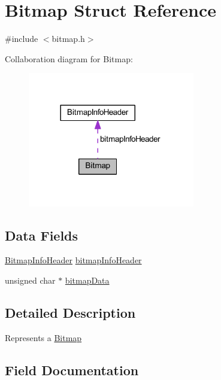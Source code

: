 \hypertarget{struct_bitmap}{}\section{Bitmap Struct Reference}
\label{struct_bitmap}


{\ttfamily \#include $<$bitmap.\+h$>$}



Collaboration diagram for Bitmap\+:\nopagebreak
\begin{figure}[H]
\begin{center}
\leavevmode
\includegraphics[width=206pt]{struct_bitmap__coll__graph}
\end{center}
\end{figure}
\subsection*{Data Fields}
\begin{DoxyCompactItemize}
\item 
\hyperlink{struct_bitmap_info_header}{Bitmap\+Info\+Header} \hyperlink{struct_bitmap_a7157ca7f3ce4be47481c472fafd89313}{bitmap\+Info\+Header}
\item 
unsigned char $\ast$ \hyperlink{struct_bitmap_a586c4bcc42cf22a033e8f60f24f627f0}{bitmap\+Data}
\end{DoxyCompactItemize}


\subsection{Detailed Description}
Represents a \hyperlink{struct_bitmap}{Bitmap} 

\subsection{Field Documentation}
\mbox{\label{struct_bitmap_a586c4bcc42cf22a033e8f60f24f627f0}} 
